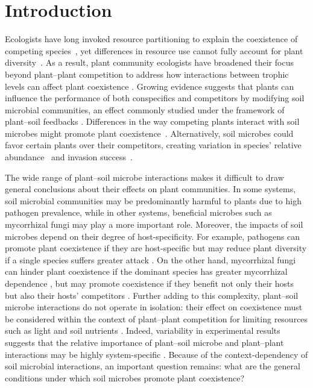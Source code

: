 \section{Introduction}
Ecologists have long invoked resource partitioning to explain the coexistence of competing species~\citep{Gause1934, Tilman1982}, yet differences in resource use cannot fully account for plant diversity~\citep{Silvertown2004}. As a result, plant community ecologists have broadened their focus beyond plant--plant competition to address how interactions between trophic levels can affect plant coexistence \citep{Chesson2008, Mordecai2011, Lanuza2018, Cardinaux2018}. Growing evidence suggests that plants can influence the performance of both conspecifics and competitors by modifying soil microbial communities, an effect commonly studied under the framework of plant--soil feedbacks \citep{Bever1997, Bever2003}. Differences in the way competing plants interact with soil microbes might promote plant coexistence~\citep{Bever2003, Chung2016}. Alternatively, soil microbes could favor certain plants over their competitors, creating variation in species' relative abundance~\citep{Klironomos2002, Mangan2010} and invasion success~\citep{Reinhart2006, Ke2015}.
\par


The wide range of plant--soil microbe interactions makes it difficult to draw general conclusions about their effects on plant communities. In some systems, soil microbial communities may be predominantly harmful to plants due to high pathogen prevalence, while in other systems, beneficial microbes such as mycorrhizal fungi may play a more important role.
Moreover, the impacts of soil microbes depend on their degree of host-specificity. For example, pathogens can promote plant coexistence if they are host-specific \citep{Bell2006, Yamazaki2008, Bagchi2010} but may reduce plant diversity if a single species suffers greater attack \citep{Mordecai2011}. On the other hand, mycorrhizal fungi can hinder plant coexistence if the dominant species has greater mycorrhizal dependence \citep{Urcelay2003}, but may promote coexistence if they benefit not only their hosts but also their hosts' competitors \citep{Bever2002}.
Further adding to this complexity, plant--soil microbe interactions do not operate in isolation: their effect on coexistence must be considered within the context of plant--plant competition for limiting resources such as light and soil nutrients \citep{Callaway2004, Casper2007, Shannon2012, Crawford2017}. Indeed, variability in experimental results suggests that the relative importance of plant--soil microbe and plant--plant interactions may be highly system-specific \citep{Lekberg2018}. Because of the context-dependency of soil microbial interactions, an important question remains: what are the general conditions under which soil microbes promote plant coexistence?
\par


